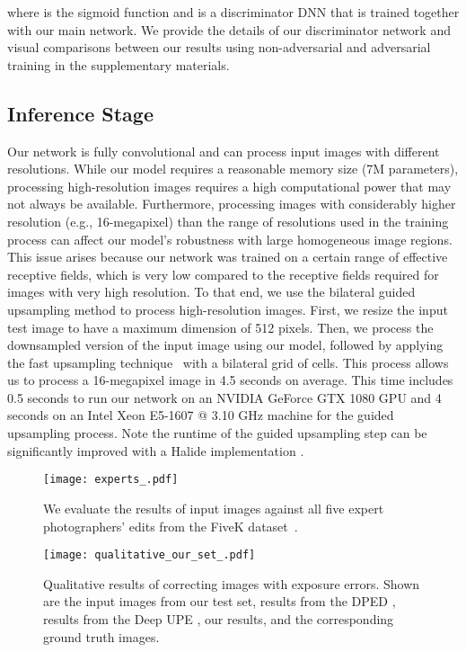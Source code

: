 \documentclass[final]{cvpr}
\begin{document}
where  is the sigmoid function and  is a discriminator DNN that is trained together with our main network. We provide the details of our discriminator network and visual comparisons between our results using non-adversarial and adversarial training in the supplementary materials.

\subsection{Inference Stage}\label{subsec:Inference}

Our network is fully convolutional and can process input images with different resolutions. While our model requires a reasonable memory size (7M parameters), processing high-resolution images requires a high computational power that may not always be available. Furthermore, processing images with considerably higher resolution (e.g., 16-megapixel) than the range of resolutions used in the training process can affect our model's robustness with large homogeneous image regions. This issue arises because our network was trained on a certain range of effective receptive fields, which is very low compared to the receptive fields required for images with very high resolution. To that end, we use the bilateral guided upsampling method \cite{chen2016bilateral} to process high-resolution images. First, we resize the input test image to have a maximum dimension of 512 pixels. Then, we process the downsampled version of the input image using our model, followed by applying the fast upsampling technique~\cite{chen2016bilateral} with a bilateral grid of  cells. This process allows us to process a 16-megapixel image in 4.5 seconds on average. This time includes 0.5 seconds to run our network on an NVIDIA GeForce GTX 1080 GPU and 4 seconds on an Intel Xeon E5-1607 @ 3.10 GHz machine for the guided upsampling process. Note the runtime of the guided upsampling step can be significantly improved with a Halide implementation \cite{HALIDE}.

\begin{figure}[t]
\centering
\texttt{[image: experts\_.pdf]}
\vspace{-6mm}
\caption{We evaluate the results of input images against all five expert photographers' edits from the FiveK dataset~\cite{fivek}.\vspace{-4mm}}
\label{fig:experts}
\end{figure}

\begin{figure*}
\centering
\texttt{[image: qualitative\_our\_set\_.pdf]}
\vspace{-7mm}
\caption{Qualitative results of correcting images with exposure errors. Shown are the input images from our test set, results from the DPED \cite{DPED}, results from the Deep UPE \cite{DPE}, our results, and the corresponding ground truth images.\vspace{-2mm}}
\label{fig:qualitative_our_set}
\end{figure*}
\end{document}
